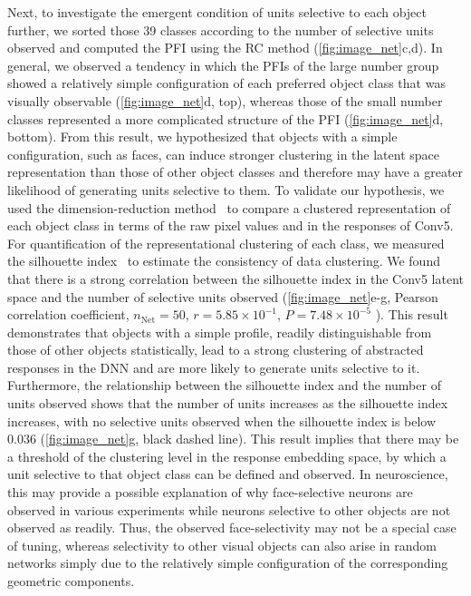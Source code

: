 \documentclass[sn-mathphys-num]{sn-jnl}%
\theoremstyle{thmstyleone}%
\theoremstyle{thmstyletwo}%
\theoremstyle{thmstylethree}%
\begin{document}
Next, to investigate the emergent condition of units selective to each object further, we sorted those 39 classes according to the number of selective units observed and computed the PFI using the RC method (\ref{fig:image_net}c,d).
In general, we observed a tendency in which the PFIs of the large number group showed a relatively simple configuration of each preferred object class that was visually observable (\ref{fig:image_net}d, top), 
whereas those of the small number classes represented a more complicated structure of the PFI (\ref{fig:image_net}d, bottom).
From this result, we hypothesized that objects with a simple configuration, such as faces, can induce stronger clustering in the latent space representation than those of other object classes and therefore may have a greater likelihood of generating units selective to them.
To validate our hypothesis, we used the dimension-reduction method~\cite{wold1987principal} to compare a clustered representation of each object class in terms of the raw pixel values and in the responses of Conv5.
For quantification of the representational clustering of each class, we measured the silhouette index~\cite{kaufman2009finding} to estimate the consistency of data clustering.
We found that there is a strong correlation between the silhouette index in the Conv5 latent space and the number of selective units observed
(\ref{fig:image_net}e-g, Pearson correlation coefficient,
$ n_\textrm{Net} = 50 $,
$ r = 5.85 \times 10^{-1} $,
$ P = 7.48 \times 10^{-5} $
).
This result demonstrates that objects with a simple profile, readily distinguishable from those of other objects statistically, lead to a strong clustering of abstracted responses in the DNN and are more likely to generate units selective to it.
Furthermore, the relationship between the silhouette index and the number of units observed shows that the number of units increases as the silhouette index increases,
with no selective units observed when the silhouette index is below 0.036 (\ref{fig:image_net}g, black dashed line).
This result implies that there may be a threshold of the clustering level in the response embedding space, by which a unit selective to that object class can be defined and observed.
In neuroscience, this may provide a possible explanation of why face-selective neurons are observed in various experiments while neurons selective to other objects are not observed as readily.
Thus, the observed face-selectivity may not be a special case of tuning, 
whereas selectivity to other visual objects can also arise in random networks simply due to the relatively simple configuration of the corresponding geometric components.
\end{document}
